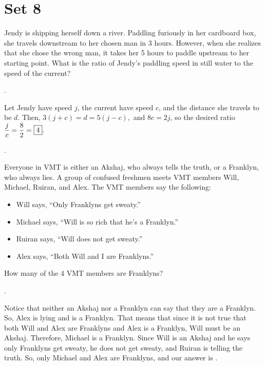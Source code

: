\documentclass[11pt]{article}
\DeclareRobustCommand{\frac}[3][0pt]{%
  {\begingroup\hspace{#1}#2\hspace{#1}\endgroup\over\hspace{#1}#3\hspace{#1}}}
\begin{document}
\eject

\pdfpageheight=5.5in

\section*{Set 8}

\begin{problem}Jendy is shipping herself down a river. Paddling furiously in her cardboard box, she travels downstream to her chosen man in 3 hours. However, when she realizes that she chose the wrong man, it takes her 5 hours to paddle upstream to her starting point. What is the ratio of Jendy's paddling speed in still water to the speed of the current?
\end{problem}

\begin{answer} . \end{answer}
\begin{solution}
Let Jendy have speed $j$, the current have speed $c$, and the distance she travels to be $d$. Then, $3(j + c) = d = 5(j- c),$ and $8c = 2j$, so the desired ratio $\displaystyle \frac{j}{c} = \frac{8}{2} = \boxed{4}.$
\end{solution}.

\begin{problem}
Everyone in VMT is either an Akshaj, who always tells the truth, or a Franklyn, who always lies. A group of confused freshmen meets VMT members Will, Michael, Ruiran, and Alex. The VMT members say the following:
	\begin{itemize}
    	\item Will says, ``Only Franklyns get sweaty.''
    	\item Michael says, ``Will is so rich that he's a Franklyn.''
    	\item Ruiran says, ``Will does not get sweaty.''
    	\item Alex says, ``Both Will and I are Franklyns.''
	\end{itemize}
	How many of the 4 VMT members are Franklyns?
\end{problem}

\begin{answer} . \end{answer}
\begin{solution}
Notice that neither an Akshaj nor a Franklyn can say that they are a Franklyn. So, Alex is lying and is a Franklyn. That means that since it is not true that both Will and Alex are Franklyns and Alex is a Franklyn, Will must be an Akshaj. Therefore, Michael is a Franklyn. Since Will is an Akshaj and he says only Franklyns get sweaty, he does not get sweaty, and Ruiran is telling the truth. So, only Michael and Alex are Franklyns, and our answer is .
\end{solution}
\end{document}
